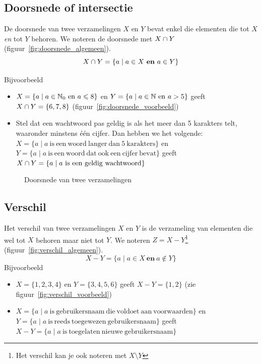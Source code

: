 \subsection{Doorsnede of intersectie}\index{\ensuremath{\intersect}}
De doorsnede van twee verzamelingen $X$ en $Y$ bevat enkel die elementen die tot $X$ \emph{en} tot $Y$ behoren. We noteren de doorsnede met $X\cap Y$ (figuur~\ref{fig:doorsnede_algemeen}).
\begin{equation*}
X\cap Y =\{a \mid a\in X ~\mathbf{en}~a\in Y \}
\end{equation*}

Bijvoorbeeld
\begin{itemize}
\item $X=\{a \mid a\in \mathbb{N}_0 ~\mathrm{en}~a\leqslant 8\}$ en $Y=\{a \mid a\in \mathbb{N} ~\mathrm{en}~a>5\}$ geeft $X\cap Y=\{6,7,8\}$ (figuur~\ref{fig:doorsnede_voorbeeld})
\item Stel dat een wachtwoord pas geldig is als het meer dan 5 karakters telt, waaronder minstens één cijfer. Dan hebben we het volgende: \\
$X=\{a\mid a ~\mathrm{is~een~woord~langer~dan~5~karakters} \}$ en \\$Y=\{a\mid a~ \mathrm{is~een~woord~dat~ook~een~cijfer~bevat } \}$ geeft \\
$X\cap Y=\{a \mid a~\mathrm{is~een~geldig~wachtwoord} \}$

\end{itemize}

\begin{figure}[htbp]
\centering
{}\qquad
\subfloat[$\{a \mid a\in \nat_0 ~\mathrm{en}~a\leqslant 8\}\intersect \{a \mid a\in \nat ~\mathrm{en}~a>5\}
	=\{6,7,8\}$]{

    \label{fig:doorsnede_voorbeeld}
}
\caption{Doorsnede van twee verzamelingen}
\end{figure}

\subsection{Verschil}
Het verschil van twee verzamelingen $X$ en $Y$ is de verzameling van elementen die wel tot $X$ behoren maar niet tot $Y$. We noteren $Z=X-Y$\footnote{Het verschil kan je ook noteren met $X\setminus Y$} (figuur~\ref{fig:verschil_algemeen}).
\begin{equation*}
X-Y=\{a\mid a\in X ~\mathbf{en}~a\not \in Y\}
\end{equation*}
Bijvoorbeeld
\begin{itemize}
  \item $X=\{1,2,3,4\}$ en $Y=\{ 3,4,5,6\}$ geeft $X-Y=\{1,2\}$ (zie figuur~\ref{fig:verschil_voorbeeld})
  \item $X=\{a\mid a ~\mathrm{is~gebruikersnaam~die~voldoet~aan~voorwaarden}\}$ en \\$Y=\{a\mid a~\mathrm{is~reeds~toegewezen~gebruikersnaam}\}$ geeft \\
        $X-Y=\{a\mid a~\mathrm{is~toegelaten~nieuwe~gebruikersnaam}\}$
\end{itemize}

